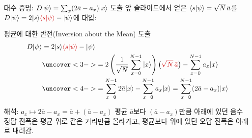 \documentclass[aspectratio=169, 10pt]{beamer}
\begin{document}
\begin{frame}{대수 증명: $D|\psi\rangle = \sum_x (2\bar{a} - a_x)|x\rangle$ 도출}
    앞 슬라이드에서 얻은 \textcolor{red!80!black}{$\langle s|\psi\rangle = \sqrt{N}\,\bar{a}$}를 $D\ket{\psi} = 2\ket{s}\textcolor{red!80!black}{\braket{s}{\psi}} - \ket{\psi}$에 대입:
    \pause
    \vspace{0.08cm}
    \begin{qcblock}{평균에 대한 반전(Inversion about the Mean) 도출}
        {\small\vspace{-0.18cm}
        \begin{align*}
            D\ket{\psi} &= 2\ket{s}\textcolor{red!80!black}{\braket{s}{\psi}} - \ket{\psi} \\
            &\uncover<3->{\displaystyle = 2\left(\frac{1}{\sqrt{N}}\sum_{x=0}^{N-1}\ket{x}\right)\big(\textcolor{red!80!black}{\sqrt{N}\,\bar{a}}\big) - \sum_{x=0}^{N-1} a_x\ket{x}} \\
            &\uncover<4->{\displaystyle = \sum_{x=0}^{N-1} 2\bar{a}\ket{x} - \sum_{x=0}^{N-1} a_x\ket{x} = \sum_{x=0}^{N-1} (2\bar{a} - a_x)\ket{x}}
        \end{align*}
        \vspace{-0.2cm}}
    \end{qcblock}
    \pause[5]
    \vspace{0.1cm}
    \begin{qctip}{해석: $a_x \mapsto 2\bar{a} - a_x = \bar{a} + (\bar{a} - a_x)$}
        평균 $\bar{a}$보다 $(\bar{a}-a_x)$만큼 아래에 있던 음수 정답 진폭은 평균 위로 같은 거리만큼 올라가고, 평균보다 위에 있던 오답 진폭은 아래로 내려감.
    \end{qctip}
\end{frame}
\end{document}
